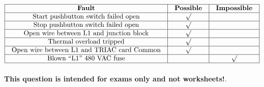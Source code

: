 






$$\vbox{\offinterlineskip
\halign{\strut
\vrule \quad\hfil # \ \hfil & 
\vrule \quad\hfil # \ \hfil & 
\vrule \quad\hfil # \ \hfil \vrule \cr
\noalign{\hrule}
%
{\bf Fault} & {\bf Possible} & {\bf Impossible} \cr
%
\noalign{\hrule}
%
Start pushbutton switch failed open & $\surd$ &  \cr
%
\noalign{\hrule}
%
Stop pushbutton switch failed open & $\surd$ &  \cr
%
\noalign{\hrule}
%
Open wire between L1 and junction block & $\surd$ &  \cr
%
\noalign{\hrule}
%
Thermal overload tripped & $\surd$ &  \cr
%
\noalign{\hrule}
%
Open wire between L1 and TRIAC card Common & $\surd$ &  \cr
%
\noalign{\hrule}
%
Blown ``L1'' 480 VAC fuse &  & $\surd$ \cr
%
\noalign{\hrule}
} %
}$$ %







{\bf This question is intended for exams only and not worksheets!}.



